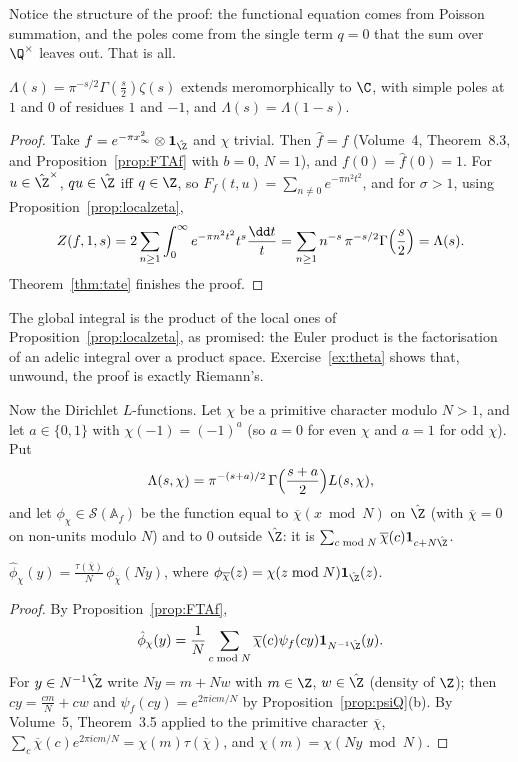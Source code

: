 Notice the structure of the proof: the functional equation comes from Poisson summation, and the poles come from the single term
$q=0$ that the sum over $\Q^\times$ leaves out. That is all.

\begin{corollary}[Riemann]\label{cor:riemannFE}
$\Lambda(s)=\pi^{-s/2}\Gamma(\frac s2)\zeta(s)$ extends meromorphically to $\C$, with simple poles at $1$ and $0$ of residues $1$ and $-1$, and
$\Lambda(s)=\Lambda(1-s)$.
\end{corollary}
\begin{proof}
Take $f=e^{-\pi x_\infty^2}\otimes\mathbf 1_{\hat{\Z}}$ and $\chi$ trivial. Then $\hat f=f$ (Volume~4, Theorem~8.3, and Proposition~\ref{prop:FTAf}
with $b=0$, $N=1$), and $f(0)=\hat f(0)=1$. For $u\in\hat{\Z}^\times$, $qu\in\hat{\Z}$ iff $q\in\Z$, so $F_f(t,u)=\sum_{n\ne0}e^{-\pi n^2t^2}$, and for
$\sigma>1$, using Proposition~\ref{prop:localzeta},
\[
Z(f,1,s)=2\sum_{n\ge1}\int_0^\infty e^{-\pi n^2t^2}t^s\frac{\dd t}t=\sum_{n\ge1}n^{-s}\,\pi^{-s/2}\Gamma\Bigl(\frac s2\Bigr)=\Lambda(s).
\]
Theorem~\ref{thm:tate} finishes the proof.
\end{proof}

The global integral is the product of the local ones of Proposition~\ref{prop:localzeta}, as promised: the Euler product is the factorisation
of an adelic integral over a product space. Exercise~\ref{ex:theta} shows that, unwound, the proof is exactly Riemann's.

Now the Dirichlet $L$-functions. Let $\chi$ be a primitive character modulo $N>1$, and let $a\in\{0,1\}$ with $\chi(-1)=(-1)^a$ (so $a=0$ for even
$\chi$ and $a=1$ for odd $\chi$). Put
\[
\Lambda(s,\chi)=\pi^{-(s+a)/2}\,\Gamma\Bigl(\frac{s+a}2\Bigr)L(s,\chi),
\]
and let $\phi_\chi\in\mathcal S(\mathbb{A}_f)$ be the function equal to $\overline\chi(x\bmod N)$ on $\hat{\Z}$ (with $\overline\chi=0$ on non-units modulo $N$) and to
$0$ outside $\hat{\Z}$: it is $\sum_{c\bmod N}\overline\chi(c)\mathbf 1_{c+N\hat{\Z}}$.

\begin{lemma}\label{lem:phichi}
$\hat{\phi}_\chi(y)=\frac{\tau(\overline\chi)}N\,\phi_{\overline\chi}(Ny)$, where $\phi_{\overline\chi}(z)=\chi(z\bmod N)\mathbf 1_{\hat{\Z}}(z)$.
\end{lemma}
\begin{proof}
By Proposition~\ref{prop:FTAf},
\[
\hat{\phi}_\chi(y)=\frac1N\sum_{c\bmod N}\overline\chi(c)\psi_f(cy)\mathbf 1_{N^{-1}\hat{\Z}}(y).
\]
For $y\in N^{-1}\hat{\Z}$ write $Ny=m+Nw$ with
$m\in\Z$, $w\in\hat{\Z}$ (density of $\Z$); then $cy=\frac{cm}N+cw$ and $\psi_f(cy)=e^{2\pi icm/N}$ by Proposition~\ref{prop:psiQ}(b). By Volume~5,
Theorem~3.5 applied to the primitive character $\overline\chi$, $\sum_c\overline\chi(c)e^{2\pi icm/N}=\chi(m)\tau(\overline\chi)$, and $\chi(m)=\chi(Ny\bmod N)$.
\end{proof}

